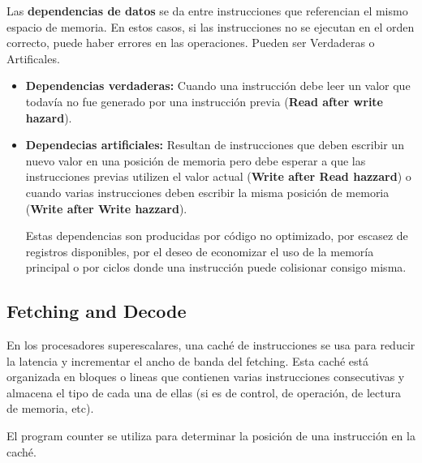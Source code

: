 Las \textbf{dependencias de datos} se da entre instrucciones que referencian el mismo espacio de memoria. En estos casos, si las instrucciones no se ejecutan en el orden correcto, puede haber errores en las operaciones. Pueden ser Verdaderas o Artificales.
\begin{itemize}
	\item \textbf{Dependencias verdaderas:} Cuando una instrucción debe leer un valor que todavía no fue generado por una instrucción previa (\textbf{Read after write hazard}).
	\item \textbf{Dependecias artificiales:} Resultan de instrucciones que deben escribir un nuevo valor en una posición de memoria pero debe esperar a que las instrucciones previas utilizen el valor actual (\textbf{Write after Read hazzard}) o cuando varias instrucciones deben escribir la misma posición de memoria (\textbf{Write after Write hazzard}).
	
	Estas dependencias son producidas por código no optimizado, por escasez de registros disponibles, por el deseo de economizar el uso de la memoría principal o por ciclos donde una instrucción puede colisionar consigo misma.
	
\end{itemize}


\subsection{Fetching and Decode}\label{ilp::superscalars::fetchDecode}
En los procesadores superescalares, una caché de instrucciones se usa para reducir la latencia y incrementar el ancho de banda del fetching. Esta caché está organizada en bloques o lineas que contienen varias instrucciones consecutivas y almacena el tipo de cada una de ellas (si es de control, de operación, de lectura de memoria, etc). 

El program counter se utiliza para determinar la posición de una instrucción en la caché.

